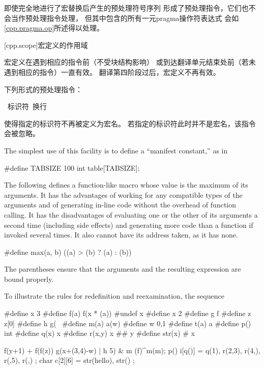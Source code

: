 \pnum
即使完全地进行了宏替换后产生的预处理符号序列
形成了预处理指令，它们也不会当作预处理指令处理，
但其中包含的所有一元pragma操作符表达式
会如\ref{cpp.pragma.op}所述得以处理。

[cpp.scope]{宏定义的作用域}%
%

\pnum
宏定义在遇到相应的指令前（不受块结构影响）
或到达翻译单元结束处前（若未遇到相应的指令）一直有效。
翻译第四阶段过后，宏定义不再有效。

\pnum
下列形式的预处理指令：

\begin{ncsimplebnf}
~标识符~换行
%
\end{ncsimplebnf}

使得指定的标识符不再被定义为宏名。
若指定的标识符此时并不是宏名，该指令会被忽略。

\pnum
\enterexample
The simplest use of this facility is to define a ``manifest constant,''
as in
\begin{codeblock}
#define TABSIZE 100
int table[TABSIZE];
\end{codeblock}
\exitexample

\pnum
\enterexample
The following defines a function-like
macro whose value is the maximum of its arguments.
It has the advantages of working for any compatible types of the arguments
and of generating in-line code without the overhead of function calling.
It has the disadvantages of evaluating one or the other of its arguments
a second time
(including
%
side effects)
and generating more code than a function if invoked several times.
It also cannot have its address taken,
as it has none.

\begin{codeblock}
#define max(a, b) ((a) > (b) ? (a) : (b))
\end{codeblock}

The parentheses ensure that the arguments and
the resulting expression are bound properly.
\exitexample

\pnum
\enterexample
To illustrate the rules for redefinition and reexamination,
the sequence

\begin{codeblock}
#define x       3
#define f(a)    f(x * (a))
#undef  x
#define x       2
#define g       f
#define z       z[0]
#define h       g(~
#define m(a)    a(w)
#define w       0,1
#define t(a)    a
#define p()     int
#define q(x)    x
#define r(x,y)  x ## y
#define str(x)  # x

f(y+1) + f(f(z)) %
g(x+(3,4)-w) | h 5) & m
    (f)^m(m);
p() i[q()] = { q(1), r(2,3), r(4,), r(,5), r(,) };
char c[2][6] = { str(hello), str() };
\end{codeblock}

